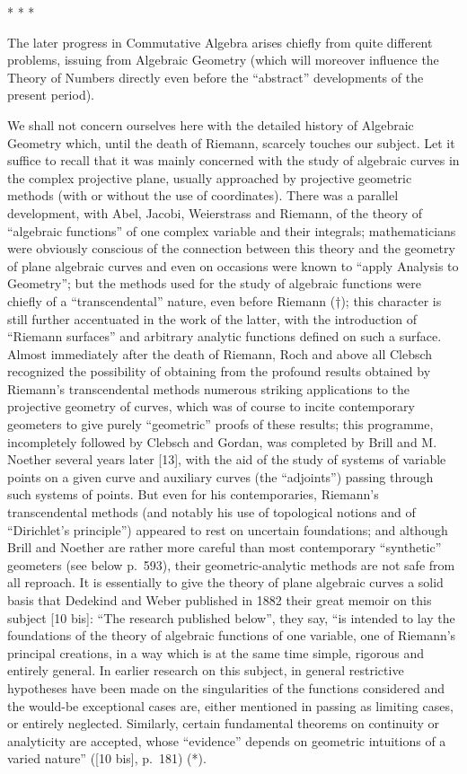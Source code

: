 \begin{center}* * *\end{center}

The later progress in Commutative Algebra arises chiefly from quite different problems, issuing from Algebraic Geometry (which will moreover influence the Theory of Numbers directly even before the ``abstract'' developments of the present period).

We shall not concern ourselves here with the detailed history of Algebraic Geometry which, until the death of Riemann, scarcely touches our subject. Let it suffice to recall that it was mainly concerned with the study of algebraic curves in the complex projective plane, usually approached by projective geometric methods (with or without the use of coordinates). There was a parallel development, with Abel, Jacobi, Weierstrass and Riemann, of the theory of ``algebraic functions'' of one complex variable and their integrals; mathematicians were obviously conscious of the connection between this theory and the geometry of plane algebraic curves and even on occasions were known to ``apply Analysis to Geometry''; but the methods used for the study of algebraic functions were chiefly of a ``transcendental'' nature, even before Riemann (†); this character is still further accentuated in the work of the latter, with the introduction of ``Riemann surfaces'' and arbitrary analytic functions defined on such a surface. Almost immediately after the death of Riemann, Roch and above all Clebsch recognized the possibility of obtaining from the profound results obtained by Riemann's transcendental methods numerous striking applications to the projective geometry of curves, which was of course to incite contemporary geometers to give purely ``geometric'' proofs of these results; this programme, incompletely followed by Clebsch and Gordan, was completed by Brill and M. Noether several years later {[}13{]}, with the aid of the study of systems of variable points on a given curve and auxiliary curves (the ``adjoints'') passing through such systems of points. But even for his contemporaries, Riemann's transcendental methods (and notably his use of topological notions and of ``Dirichlet's principle'') appeared to rest on uncertain foundations; and although Brill and Noether are rather more careful than most contemporary ``synthetic'' geometers (see below p.~593), their geometric-analytic methods are not safe from all reproach. It is essentially to give the theory of plane algebraic curves a solid basis that Dedekind and Weber published in 1882 their great memoir on this subject {[}10 bis{]}: ``The research published below'', they say, ``is intended to lay the foundations of the theory of algebraic functions of one variable, one of Riemann's principal creations, in a way which is at the same time simple, rigorous and entirely general. In earlier research on this subject, in general restrictive hypotheses have been made on the singularities of the functions considered and the would-be exceptional cases are, either mentioned in passing as limiting cases, or entirely neglected. Similarly, certain fundamental theorems on continuity or analyticity are accepted, whose ``evidence'' depends on geometric intuitions of a varied nature'' ({[}10 bis{]}, p.~181) (*).

